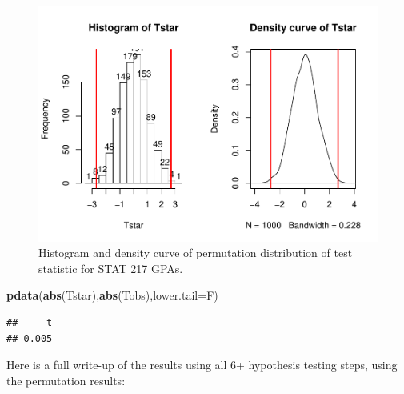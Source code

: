 \documentclass[]{book}
\newenvironment{Shaded}{\begin{snugshade}}{\end{snugshade}}
\newcommand{\KeywordTok}[1]{\textcolor[rgb]{0.13,0.29,0.53}{\textbf{#1}}}
\newcommand{\DataTypeTok}[1]{\textcolor[rgb]{0.13,0.29,0.53}{#1}}
\newcommand{\NormalTok}[1]{#1}
\begin{document}
\begin{figure}
\centering
\includegraphics{GreenwoodBanner_files/figure-latex/Figure2-16-1.pdf}
\caption{\label{fig:Figure2-16}Histogram and density curve of permutation distribution of
test statistic for STAT 217 GPAs.}
\end{figure}

\begin{Shaded}
\begin{Highlighting}[]
\KeywordTok{pdata}\NormalTok{(}\KeywordTok{abs}\NormalTok{(Tstar),}\KeywordTok{abs}\NormalTok{(Tobs),}\DataTypeTok{lower.tail=}\NormalTok{F)}
\end{Highlighting}
\end{Shaded}

\begin{verbatim}
##     t 
## 0.005
\end{verbatim}

Here is a full write-up of the results using all 6+ hypothesis testing
steps, using the permutation results:
\end{document}
